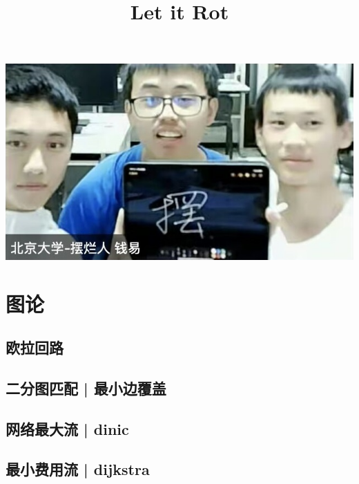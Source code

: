 \documentclass{article}
\title{\fontsize{64.0pt}{\baselineskip}\selectfont Let it Rot}
\date{}
\begin{document}
\begin{titlepage}
\maketitle

\center \includegraphics[scale=0.60]{pics/letitrot.jpg}

\thispagestyle{empty}
\pagebreak
\thispagestyle{empty}

\tableofcontents
\newpage
\end{titlepage}
	
\section{图论}
\pagestyle{fancy}
    \chead{\Huge \thepage}
    \rhead{\Huge \thepage}
    \cfoot{\Huge \thepage}
    \rfoot{\Huge \thepage}

\subsection{欧拉回路} %

\newpage

\subsection{二分图匹配 | 最小边覆盖}

\newpage

\subsection{网络最大流 | dinic}

\newpage

\subsection{最小费用流 | dijkstra}

\newpage
\end{document}
